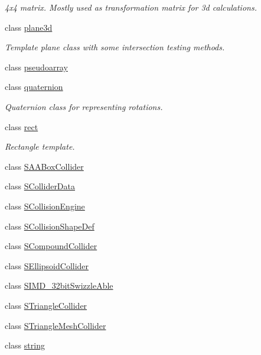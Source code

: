 \begin{DoxyCompactItemize}
\begin{DoxyCompactList}\small\item\em 4x4 matrix. Mostly used as transformation matrix for 3d calculations. \end{DoxyCompactList}\item 
class \hyperlink{classirr_1_1core_1_1plane3d}{plane3d}
\begin{DoxyCompactList}\small\item\em Template plane class with some intersection testing methods. \end{DoxyCompactList}\item 
class \hyperlink{classirr_1_1core_1_1pseudoarray}{pseudoarray}
\item 
class \hyperlink{classirr_1_1core_1_1quaternion}{quaternion}
\begin{DoxyCompactList}\small\item\em Quaternion class for representing rotations. \end{DoxyCompactList}\item 
class \hyperlink{classirr_1_1core_1_1rect}{rect}
\begin{DoxyCompactList}\small\item\em Rectangle template. \end{DoxyCompactList}\item 
class \hyperlink{classirr_1_1core_1_1SAABoxCollider}{S\+A\+A\+Box\+Collider}
\item 
class \hyperlink{classirr_1_1core_1_1SColliderData}{S\+Collider\+Data}
\item 
class \hyperlink{classirr_1_1core_1_1SCollisionEngine}{S\+Collision\+Engine}
\item 
class \hyperlink{classirr_1_1core_1_1SCollisionShapeDef}{S\+Collision\+Shape\+Def}
\item 
class \hyperlink{classirr_1_1core_1_1SCompoundCollider}{S\+Compound\+Collider}
\item 
class \hyperlink{classirr_1_1core_1_1SEllipsoidCollider}{S\+Ellipsoid\+Collider}
\item 
class \hyperlink{classirr_1_1core_1_1SIMD__32bitSwizzleAble}{S\+I\+M\+D\+\_\+32bit\+Swizzle\+Able}
\item 
class \hyperlink{classirr_1_1core_1_1STriangleCollider}{S\+Triangle\+Collider}
\item 
class \hyperlink{classirr_1_1core_1_1STriangleMeshCollider}{S\+Triangle\+Mesh\+Collider}
\item 
class \hyperlink{classirr_1_1core_1_1string}{string}
\item 

\end{DoxyCompactItemize}
